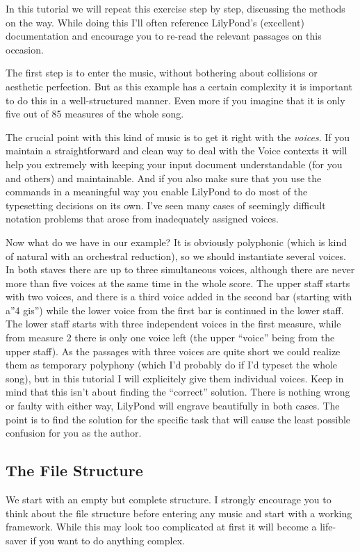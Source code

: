 \documentclass[../../LilyPond-Tutorials]{subfiles}
\begin{document}
In this tutorial we will repeat this exercise step by step, discussing the methods on the way. 
While doing this I'll often reference LilyPond's (excellent) documentation and encourage you to re-read the relevant passages on this occasion.

The first step is to enter the music, without bothering about collisions or aesthetic perfection. 
But as this example has a certain complexity it is important to do this in a well-structured manner. 
Even more if you imagine that it is only five out of 85 measures of the whole song.

The crucial point with this kind of music is to get it right with the \emph{voices}. 
If you maintain a straightforward and clean way to deal with the Voice contexts  it will help you extremely with keeping your input document understandable (for you and others) and maintainable. 
And if you also make sure that you use the  commands  in a meaningful way you enable LilyPond to do most of the typesetting decisions on its own. I've seen many cases of seemingly difficult notation problems that arose from inadequately assigned voices.

Now what do we have in our example? 
It is obviously polyphonic (which is kind of natural with an orchestral reduction), so we should instantiate several voices. 
In both staves there are up to three simultaneous voices, although there are never more than five voices at the same time in the whole score. 
The upper staff starts with two voices, and there is a third voice added in the second bar (starting with a''4 gis'') while the lower voice from the first bar is continued in the lower staff. 
The lower staff starts with three independent voices in the first measure, while from measure 2 there is only one voice left (the upper “voice” being from the upper staff). 
As the passages with three voices are quite short we could realize them as temporary polyphony (which I'd probably do if I'd typeset the whole song), but in this tutorial I will explicitely give them individual voices. 
Keep in mind that this isn't about finding the “correct” solution. 
There is nothing wrong or faulty with either way, LilyPond will engrave beautifully in both cases. 
The point is to find the solution for the specific task that will cause the least possible confusion for you as the author.

\subsection{The File Structure}
We start with an empty but complete structure. 
I strongly encourage you to think about the file structure before entering any music and start with a working framework. 
While this may look too complicated at first it will become a life-saver if you want to do anything complex.
\end{document}
